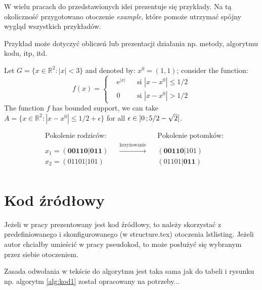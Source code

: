 W wielu pracach do przedstawionych idei prezentuje się przykłady. Na tą okoliczność przygotowano otoczenie {\it example}, które pomoże utrzymać spójny wygląd wszystkich przykładów. 

Przykład może dotyczyć obliczeń lub prezentacji działania np. metody, algorytmu kodu, itp, itd.

\begin{example}

Let $G=\{x\in\mathbb{R}^2:|x|<3\}$ and denoted by: $x^0=(1,1)$; consider the function:
\begin{equation}
f(x)=\left\{\begin{aligned} & \mathrm{e}^{|x|} & & \text{si $|x-x^0|\leq 1/2$}\\
& 0 & & \text{si $|x-x^0|> 1/2$}\end{aligned}\right.
\end{equation}
The function $f$ has bounded support, we can take $A=\{x\in\mathbb{R}^2:|x-x^0|\leq 1/2+\epsilon\}$ for all $\epsilon\in\mathopen{]}0\,;5/2-\sqrt{2}\mathclose{[}$.
\end{example}


\begin{example}
\begin{align*}
&\text{Pokolenie rodziców:} & & & &\text{Pokolenie potomków:} \\
&x_1 = (\textbf{00110} | \textbf{011}) & &\xrightarrow{\text{krzyżowanie}} & &(\textbf{00110}|1 0 1)\\
&x_2 = (0 1 1 0 1 | 1 0 1) & & & &(0 1 1 0 1|\textbf{011})\\
\end{align*}
\end{example}



\section{Kod źródłowy}

Jeżeli w pracy prezentowany jest kod źródłowy, to należy skorzystać z predefiniowanego i skonfigurowanego (w structure.tex) otoczenia lstlisting. Jeżeli autor chciałby umieścić w pracy pseudokod, to może posłużyć się wybranym przez siebie otoczeniem.

Zasada odwołania w tekście do algorytmu jest taka sama jak do tabeli i rysunku np. algorytm \ref{alg:kod1} został opracowany na potrzeby...

